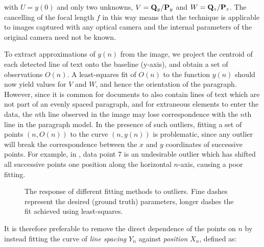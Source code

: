 { \parindent 0mm
with $U=y(0)$ and only two unknowns,
$V = {{ \bf Q }_y}/{{ \bf P }_y}$ and $W = {{ \bf Q }_z}/{{ \bf P }_z}$.
The cancelling of the focal length $f$ in this way means that the technique is applicable to images captured with any optical camera and the internal parameters of the original camera need not be known.

To extract approximations of $y(n)$ from the image, we project the centroid of
each detected line of text onto the baseline (y-axis), and obtain a set of
observations $O(n)$. 
A least-squares fit of $O(n)$ to the function $y(n)$ should now yield values for $V$ and $W$, and hence the orientation of the paragraph.
However, since it is common for documents to also contain lines of text which are not part of an evenly spaced paragraph, and for extraneous elements to enter the data, the $n$th line observed in the image may lose correspondence with the $n$th line in the paragraph model.
In the presence of such outliers, fitting a set of points $(n,O(n))$ to the curve $(n,y(n))$ 
is problematic, since any outlier will break the correspondence between the $x$
and $y$ coordinates of successive points.
For example, in , data point 7 is an undesirable outlier
which has shifted all successive points one position along the horizontal $n$-axis,
causing a poor fitting.
\begin{figure}[t]
\centering
\begin{center}
	\caption{The response of different fitting methods to outliers.  Fine dashes
		represent the desired (ground truth) parameters, longer dashes the fit
		achieved using least-squares.
	}
	\label{fittingexamples}
\end{center}
\end{figure}
It is therefore preferable to remove the direct dependence of the points on $n$
by instead fitting the curve of {\em line spacing} $Y_n$ against {\em position} $X_n$, defined as:


}
